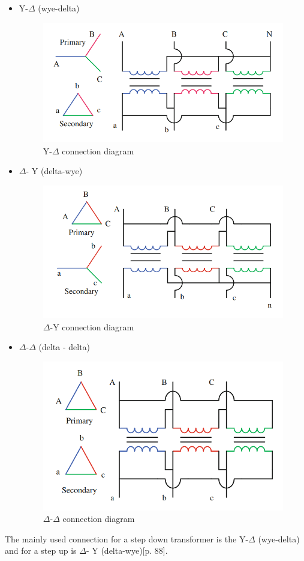 {\begin{itemize}
\newpage
\item Y-$\Delta$ (wye-delta)
\begin{figure}[h!]
\center
\includegraphics[scale=0.45]{graphics/Y_D_Connection.PNG}
\caption{Y-$\Delta$ connection diagram}
\end{figure}
\item $\Delta$- Y (delta-wye)
\begin{figure}[h!]
\center
\includegraphics[scale=0.45]{graphics/D_Y_Connection.PNG}
\caption{$\Delta$-Y connection diagram}
\end{figure}
\item $\Delta$-$\Delta$ (delta - delta)
\begin{figure}[h!]
\center
\includegraphics[scale=0.45]{graphics/D_D_Connection.PNG}
\caption{$\Delta$-$\Delta$ connection diagram}
\end{figure}
\end{itemize}  
The mainly used connection for a step down transformer is the Y-$\Delta$ (wye-delta) and for a step up is $\Delta$- Y (delta-wye)\cite{Salam_2016}[p. 88].
}{}

